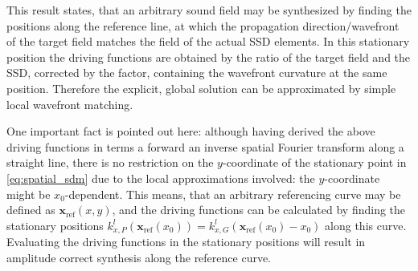 \documentclass[12pt,a4paper]{article}
\newcommand{\vxref}{\mathbf{x}_{\mathrm{ref}}}
\begin{document}
This result states, that an arbitrary sound field may be synthesized by finding the positions along the reference line, at which the propagation direction/wavefront of the target field matches the field of the actual SSD elements.
In this stationary position the driving functions are obtained by the ratio of the target field and the SSD, corrected by the factor, containing the wavefront curvature at the same position.
Therefore the explicit, global solution can be approximated by simple local wavefront matching.

One important fact is pointed out here: although having derived the above driving functions in terms a forward an inverse spatial Fourier transform along a straight line, there is no restriction on the $y$-coordinate of the stationary point in \eqref{eq:spatial_sdm} due to the local approximations involved: the $y$-coordinate might be $x_0$-dependent.
This means, that an arbitrary referencing curve may be defined as $\vxref(x,y)$, and the driving functions can be calculated by finding the stationary positions $k_{x,P}^l(\vxref(x_0)) = k_{x,G}^l(\vxref(x_0) - x_0)$ along this curve.
Evaluating the driving functions in the stationary positions will result in amplitude correct synthesis along the reference curve. 
\end{document}
